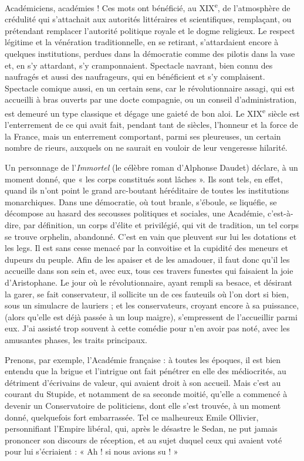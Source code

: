 \documentclass[french,twoside]{book} %
\begin{document}
Académiciens, académies ! Ces mots ont bénéficié, au XIX\textsuperscript{e}, de l’atmosphère de crédulité qui s’attachait aux autorités littéraires et scientifiques, remplaçant, ou prétendant remplacer l’autorité politique royale et le dogme religieux. Le respect légitime et la vénération traditionnelle, en se retirant, s’attardaient encore à quelques institutions, perdues dans la démocratie comme des pilotis dans la vase et, en s’y attardant, s’y cramponnaient. Spectacle navrant, bien connu des naufragés et aussi des naufrageurs, qui en bénéficient et s’y complaisent. Spectacle comique aussi, en un certain sens, car le révolutionnaire assagi, qui est accueilli à bras ouverts par une docte compagnie, ou un conseil d’administration, est demeuré un type classique et dégage une gaieté de bon aloi. Le XIX\textsuperscript{e} siècle est l’enterrement de ce qui avait fait, pendant tant de siècles, l’honneur et la force de la France, mais un enterrement comportant, parmi ses pleureuses, un certain nombre de rieurs, auxquels on ne saurait en vouloir de leur vengeresse hilarité.\par
Un personnage de l’{\itshape Immortel} (le célèbre roman d’Alphonse Daudet) déclare, à un moment donné, que « les corps constitués sont lâches ». Ils sont tels, en effet, quand ils n’ont point le grand arc-boutant héréditaire de toutes les institutions monarchiques. Dans une démocratie, où tout branle, s’éboule, se liquéfie, se décompose au hasard des secousses politiques et sociales, une Académie, c’est-à-dire, par définition, un corps d’élite et privilégié, qui vit de tradition, un tel corps se trouve orphelin, abandonné. C’est en vain que pleuvent sur lui les dotations et les legs. Il est sans cesse menacé par la convoitise et la cupidité des meneurs et dupeurs du peuple. Afin de les apaiser et de les amadouer, il faut donc qu’il les accueille dans son sein et, avec eux, tous ces travers funestes qui faisaient la joie d’Aristophane. Le jour où le révolutionnaire, ayant rempli sa besace, et désirant la garer, se fait conservateur, il sollicite un de ces fauteuils où l’on dort si bien, sous un simulacre de lauriers ; et les conservateurs, croyant encore à sa puissance, (alors qu’elle est déjà passée à un loup maigre), s’empressent de l’accueillir parmi eux. J’ai assisté trop souvent à cette comédie pour n’en avoir pas noté, avec les amusantes phases, les traits principaux.\par
Prenons, par exemple, l’Académie française : à toutes les époques, il est bien entendu que la brigue et l’intrigue ont fait pénétrer en elle des médiocrités, au détriment d’écrivains de valeur, qui avaient droit à son accueil. Mais c’est au courant du Stupide, et notamment de sa seconde moitié, qu’elle a commencé à devenir un Conservatoire de politiciens, dont elle s’est trouvée, à un moment donné, quelquefois fort embarrassée. Tel ce malheureux Emile Ollivier, personnifiant l’Empire libéral, qui, après le désastre le Sedan, ne put jamais prononcer son discours de réception, et au sujet duquel ceux qui avaient voté pour lui s’écriaient : « Ah ! si nous avions su ! »\par
\end{document}

